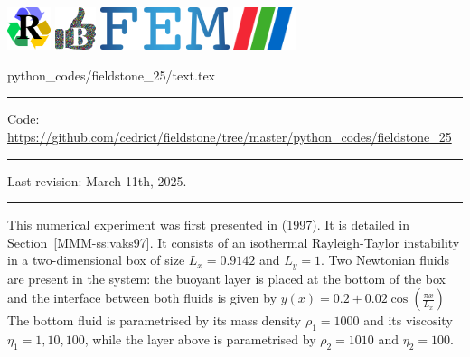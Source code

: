 \noindent
\includegraphics[height=1.25cm]{images/pictograms/replication}
\includegraphics[height=1.25cm]{images/pictograms/benchmark}
\includegraphics[height=1.25cm]{images/pictograms/FEM}
\includegraphics[height=1.25cm]{images/pictograms/paraview}


\begin{flushright} {\tiny {\color{gray} python\_codes/fieldstone\_25/text.tex}} \end{flushright}

\par\noindent\rule{\textwidth}{0.4pt}

\begin{center}
\inpython
{\small Code: \url{https://github.com/cedrict/fieldstone/tree/master/python_codes/fieldstone_25}}
\end{center}

\par\noindent\rule{\textwidth}{0.4pt}

Last revision: March 11th, 2025.

\par\noindent\rule{\textwidth}{0.4pt}


This numerical experiment was first presented in \textcite{vaks97} (1997).
It is detailed in Section~\ref{MMM-ss:vaks97}.
It consists of an isothermal Rayleigh-Taylor instability in a two-dimensional box
of size $L_x=0.9142$ and $L_y=1$.
Two Newtonian fluids are present in the system: the buoyant layer is placed at the bottom of 
the box and the interface between both fluids is given by 
$
y(x)=0.2+0.02\cos \left( \frac{\pi x}{L_x}  \right)
$
The bottom fluid is parametrised by its mass density $\rho_1=1000$ and its viscosity $\eta_1=1,10,100$, 
while the layer above is parametrised by $\rho_2=1010$ and $\eta_2=100$.

